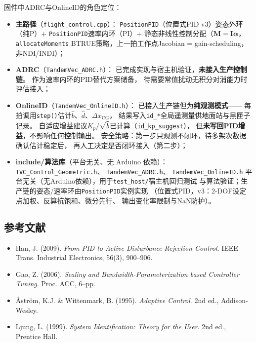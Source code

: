 固件中ADRC与OnlineID的角色定位：
\begin{itemize}
    \item \textbf{主路径}（\texttt{flight\_control.cpp}）：
          \texttt{PositionPID}（位置式PID v3）姿态外环（纯P）+
          \texttt{PositionPID}速率内环（PI）+
          静态非线性控制分配（$\mathbf{M}=\mathbf{I}\boldsymbol{\alpha}$，
          \texttt{allocateMoments} BTRUE策略，上一拍工作点Jacobian
          = gain-scheduling，非NDI/INDI）；
    \item \textbf{ADRC}（\texttt{TandemVec\_ADRC.h}）：
          已完成实现与宿主机验证，\textbf{未接入生产控制链}。
          作为速率内环的PID替代方案储备，
          待需要常值扰动无积分对消能力时评估接入；
    \item \textbf{OnlineID}（\texttt{TandemVec\_OnlineID.h}）：
          已接入生产链但为\textbf{纯观测模式}——
          每拍调用\texttt{step()}估计$\hat{b}$、$\hat{d}$、$\Delta x_{\mathrm{CG}}$，
          结果写入\texttt{id\_*}全局遥测量供地面站与黑匣子记录。
          自适应增益建议$K_p/\sqrt{\hat{b}}$已计算（\texttt{id\_kp\_suggest}），
          但\textbf{未写回PID增益}，不影响任何控制输出。
          安全策略：第一步只观测不闭环，待多架次数据确认估计稳定后，
          再人工决定是否闭环接入（第二步）；
    \item \textbf{include/算法库}（平台无关、无 Arduino 依赖）：\\[2pt]
          \texttt{TVC\_Control\_Geometric.h}、\allowbreak
          \texttt{TandemVec\_ADRC.h}、\allowbreak
          \texttt{TandemVec\_OnlineID.h}
          平台无关（无Arduino依赖），用于\texttt{test\_host/}宿主机回归测试
          与算法验证；生产链的姿态/速率环由\texttt{PositionPID}实例实现
          （位置式PID，v3：2-DOF设定点加权、反算抗饱和、微分先行、
          输出变化率限制与NaN防护）。
\end{itemize}

\subsection{参考文献}

\begin{itemize}
    \item Han, J. (2009). \textit{From PID to Active Disturbance Rejection Control}.
          IEEE Trans. Industrial Electronics, 56(3), 900--906.
    \item Gao, Z. (2006). \textit{Scaling and Bandwidth-Parameterization based
          Controller Tuning}. Proc. ACC, 6--pp.
    \item Åström, K.J. \& Wittenmark, B. (1995). \textit{Adaptive Control}.
          2nd ed., Addison-Wesley.
    \item Ljung, L. (1999). \textit{System Identification: Theory for the User}.
          2nd ed., Prentice Hall.
\end{itemize}
